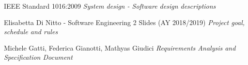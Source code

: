 \begin{thebibliography}{9} \label{Bibliography}

	IEEE Standard 1016:2009 \emph{System design - Software design descriptions}

  Elisabetta Di Nitto - Software Engineering 2 Slides (AY 2018/2019) \emph{Project goal, schedule and rules}

	Michele Gatti, Federica Gianotti, Mathyas Giudici \emph{Requirements Analysis and Specification Document}

\end{thebibliography}
